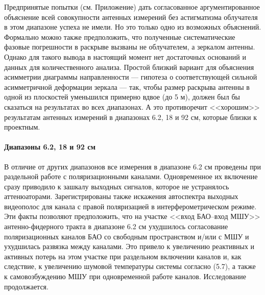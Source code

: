 Предпринятые попытки (см. Приложение) дать согласованное аргументированное объяснение всей
совокупности антенных измерений без астигматизма облучателя в этом диапазоне успеха не имели. Но это
только одно из возможных объяснений. Формально можно также предположить, что полученные
систематические фазовые погрешности в раскрыве вызваны не облучателем, а зеркалом антенны. Однако
для такого вывода в настоящий момент нет достаточных оснований и данных для количественного анализа.
Простой близкий вариант для объяснения асимметрии диаграммы направленности --- гипотеза о
соответствующей сильной асимметричной деформации зеркала --- так, чтобы размер раскрыва антенны в
одной из плоскостей уменьшился примерно вдвое (до 5 м), должен был бы сказаться на результатах во
всех диапазонах. А это противоречит <<хорошим>> результатам антенных измерений в диапазонах 6.2, 18
и 92 см, которые близки к проектным.

\paragraph{Диапазоны 6.2, 18 и 92 см}

В отличие от других диапазонов все измерения в диапазоне 6.2 см проведены при раздельной работе с
поляризационными каналами. Одновременное их включение сразу приводило к зашкалу выходных сигналов,
которое не устранялось аттенюаторами. Зарегистрированы также искажения автоспектра выходных
видеополос для канала с правой поляризацией в интерферометрическом режиме. Эти факты позволяют
предположить, что на участке <<вход БАО--вход МШУ>> антенно-фидерного тракта в диапазоне 6.2 см
ухудшилось согласование поляризационных каналов БАО со свободным пространством и/или с МШУ и
ухудшилась развязка между каналами. Это привело к увеличению реактивных и активных потерь на этом
участке при раздельном включении каналов и, как следствие, к увеличению шумовой температуры системы
согласно (5.7), а также к самовозбуждению МШУ при одновременной работе каналов. Исследование
продолжается.

